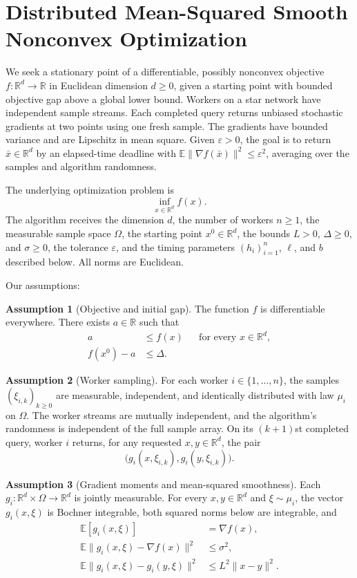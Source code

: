 \documentclass[10pt]{article}
\theoremstyle{definition}
\newtheorem{assumption}{Assumption}
\begin{document}
\section*{Distributed Mean-Squared Smooth Nonconvex Optimization}
We seek a stationary point of a differentiable, possibly nonconvex objective $f:\mathbb{R}^d\to\mathbb{R}$ in Euclidean dimension $d\geq 0$, given a starting point with bounded objective gap above a global lower bound. Workers on a star network have independent sample streams. Each completed query returns unbiased stochastic gradients at two points using one fresh sample. The gradients have bounded variance and are Lipschitz in mean square. Given $\varepsilon>0$, the goal is to return $\bar{x}\in\mathbb{R}^d$ by an elapsed-time deadline with $\mathbb{E}\|\nabla f(\bar{x})\|^2\leq\varepsilon^2$, averaging over the samples and algorithm randomness.

The underlying optimization problem is
\[
\inf_{x\in\mathbb{R}^d} f(x).
\]
The algorithm receives the dimension $d$, the number of workers $n\geq 1$, the measurable sample space $\Omega$, the starting point $x^0\in\mathbb{R}^d$, the bounds $L>0$, $\Delta\geq 0$, and $\sigma\geq 0$, the tolerance $\varepsilon$, and the timing parameters $(h_i)_{i=1}^n$, $\ell$, and $b$ described below. All norms are Euclidean.

Our assumptions:
\begin{assumption}[Objective and initial gap]
The function $f$ is differentiable everywhere. There exists $a\in\mathbb{R}$ such that
\[
\begin{aligned}
a &\leq f(x) &&\text{for every }x\in\mathbb{R}^d,\\
f(x^0)-a &\leq \Delta.
\end{aligned}
\]
\end{assumption}

\begin{assumption}[Worker sampling]
For each worker $i\in\{1,\ldots,n\}$, the samples $(\xi_{i,k})_{k\geq 0}$ are measurable, independent, and identically distributed with law $\mu_i$ on $\Omega$. The worker streams are mutually independent, and the algorithm's randomness is independent of the full sample array. On its $(k+1)$st completed query, worker $i$ returns, for any requested $x,y\in\mathbb{R}^d$, the pair
\[
\bigl(g_i(x,\xi_{i,k}),g_i(y,\xi_{i,k})\bigr).
\]
\end{assumption}

\begin{assumption}[Gradient moments and mean-squared smoothness]
Each $g_i:\mathbb{R}^d\times\Omega\to\mathbb{R}^d$ is jointly measurable. For every $x,y\in\mathbb{R}^d$ and $\xi\sim\mu_i$, the vector $g_i(x,\xi)$ is Bochner integrable, both squared norms below are integrable, and
\[
\begin{aligned}
\mathbb{E}[g_i(x,\xi)] &= \nabla f(x),\\
\mathbb{E}\|g_i(x,\xi)-\nabla f(x)\|^2 &\leq \sigma^2,\\
\mathbb{E}\|g_i(x,\xi)-g_i(y,\xi)\|^2 &\leq L^2\|x-y\|^2.
\end{aligned}
\]
\end{assumption}
\end{document}
